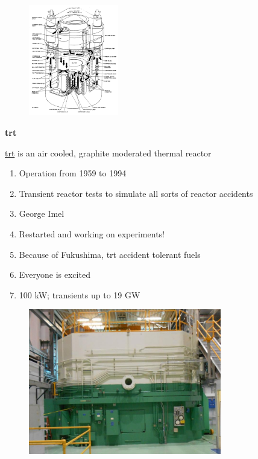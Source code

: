\documentclass[aspectratio=1610,pdftex,dvipsnames,compress,xcolor={dvipsnames}]{beamer}
\newcommand{\acs}{\acrshort} %
\begin{document}
\begin{frame}{}
    \begin{figure}
        \centering
        \includegraphics[width=0.35\textwidth]{ebrii.jpg}
    \end{figure}
\end{frame}


\begin{frame}[plain]{}
    \centering\LARGE\textbf{\acs{trt}}
\end{frame}


\addtocounter{framenumber}{-1} 
\begin{frame}{\href{https://uidaho.pressbooks.pub/nuclearengineering/chapter/front-end-of-the-fuel-cycle/}{\acs{trt}} is an air cooled, graphite moderated thermal reactor}
    \begin{enumerate}[series=outerlist,topsep=0pt,itemsep=21pt,leftmargin=*,label=(\arabic*)]
        \item[]Operation from 1959 to 1994
        \item[]Transient reactor tests to simulate all sorts of reactor accidents
        \item[]George Imel
        \item[]Restarted and working on experiments!
        \item[]Because of Fukushima, \acs{trt} accident tolerant fuels
        \item[]Everyone is excited
        \item[]100 kW; transients up to 19 GW
    \end{enumerate}
\end{frame}


\begin{frame}{}
    \begin{figure}
        \centering
        \includegraphics[width=0.75\textwidth]{treat.jpg}
    \end{figure}
\end{frame}
\end{document}
